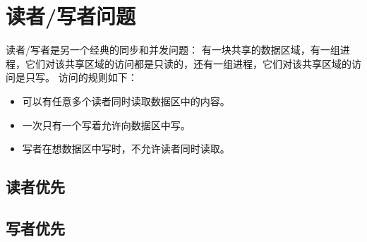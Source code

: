 
\section{读者/写者问题}
{
    读者/写者是另一个经典的同步和并发问题：
    有一块共享的数据区域，有一组进程，它们对该共享区域的访问都是只读的，还有一组进程，它们对该共享区域的访问是只写。
    访问的规则如下：

    \begin{itemize}
        \item 可以有任意多个读者同时读取数据区中的内容。
        \item 一次只有一个写着允许向数据区中写。
        \item 写者在想数据区中写时，不允许读者同时读取。
    \end{itemize}

    \subsection{读者优先}
    {

    }

    \subsection{写者优先}
    {

    }
}
